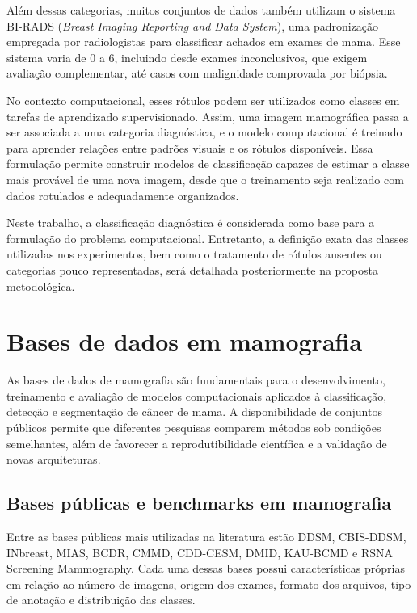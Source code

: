 \documentclass[
    12pt,
    openright,
    oneside,
    a4paper,
    english,
    brazil
]{abntex2}
\begin{document}
Além dessas categorias, muitos conjuntos de dados também utilizam o sistema BI-RADS (\textit{Breast Imaging Reporting and Data System}), uma padronização empregada por radiologistas para classificar achados em exames de mama. Esse sistema varia de 0 a 6, incluindo desde exames inconclusivos, que exigem avaliação complementar, até casos com malignidade comprovada por biópsia.

No contexto computacional, esses rótulos podem ser utilizados como classes em tarefas de aprendizado supervisionado. Assim, uma imagem mamográfica passa a ser associada a uma categoria diagnóstica, e o modelo computacional é treinado para aprender relações entre padrões visuais e os rótulos disponíveis. Essa formulação permite construir modelos de classificação capazes de estimar a classe mais provável de uma nova imagem, desde que o treinamento seja realizado com dados rotulados e adequadamente organizados.

Neste trabalho, a classificação diagnóstica é considerada como base para a formulação do problema computacional. Entretanto, a definição exata das classes utilizadas nos experimentos, bem como o tratamento de rótulos ausentes ou categorias pouco representadas, será detalhada posteriormente na proposta metodológica.

\section{Bases de dados em mamografia}

As bases de dados de mamografia são fundamentais para o desenvolvimento, treinamento e avaliação de modelos computacionais aplicados à classificação, detecção e segmentação de câncer de mama. A disponibilidade de conjuntos públicos permite que diferentes pesquisas comparem métodos sob condições semelhantes, além de favorecer a reprodutibilidade científica e a validação de novas arquiteturas.

\subsection{Bases públicas e benchmarks em mamografia}

Entre as bases públicas mais utilizadas na literatura estão DDSM, CBIS-DDSM, INbreast, MIAS, BCDR, CMMD, CDD-CESM, DMID, KAU-BCMD e RSNA Screening Mammography. Cada uma dessas bases possui características próprias em relação ao número de imagens, origem dos exames, formato dos arquivos, tipo de anotação e distribuição das classes.
\end{document}
